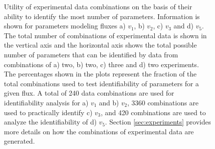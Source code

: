 \documentclass[10pt]{article}
\begin{document}
\begin{figure}[!tbhp]
	\caption{Utility of experimental data combinations on the basis of their ability to identify the most number of parameters. Information is shown for parameters modeling fluxes a) $v_1$, b) $v_2$, c) $v_3$ and d) $v_5$. The total number of combinations of experimental data is shown in the vertical axis and the horizontal axis shows the total possible number of parameters that can be identified by data from combinations of a) two, b) two, c) three and d) two experiments. The percentages shown in the plots represent the fraction of the total combinations used to test identifiability of parameters for a given flux. A total of 240 data combinations are used for identifiability analysis for a) $v_1$ and b) $v_2$, 3360 combinations are used to practically identify c) $v_3$, and 420 combinations are used to analyze the identifiability of d) $v_5$. Section \ref{sec:experiments} provides more details on how the combinations of experimental data are generated.}\label{fig:data_utility}
\end{figure}	
\end{document}
